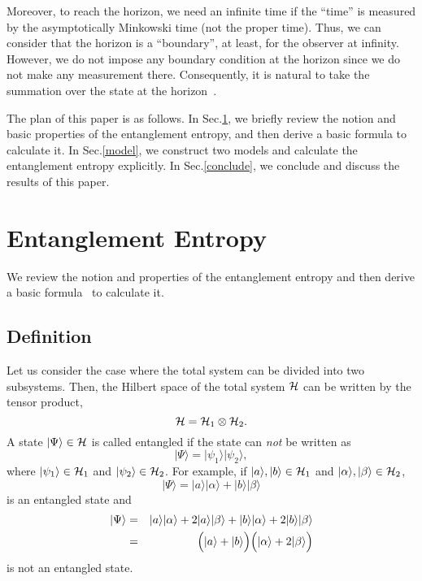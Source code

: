Moreover, to reach the horizon, we need an infinite time 
if the ``time'' is measured by
the asymptotically Minkowski time (not the proper time).
Thus, we can consider that the horizon is a ``boundary'',
at least, for the observer at infinity.
However, we do not impose any boundary condition at the horizon
since we do not make any measurement there.
Consequently, it is natural to take the summation
over the state at the horizon~\cite{Hawkin76}.

The plan of this paper is as follows.
In Sec.\ref{formula}, we briefly review
the notion and basic properties of the entanglement entropy,
and then derive a basic formula to calculate it.
In Sec.\ref{model}, we construct two models and
calculate the entanglement entropy explicitly.
In Sec.\ref{conclude}, we conclude and discuss
the results of this paper.

\section{Entanglement Entropy}
\label{formula}
We review the notion and properties
of the entanglement entropy
and then derive a basic
formula~\cite{BKLS86} to calculate it.

\subsection{Definition}
Let us consider the case where the total system 
can be divided into two subsystems.
Then, the Hilbert space of the total system ${\cal H}$
can be written by the tensor product,
\begin{equation}
{\cal H}={\cal H}_1\otimes{\cal H}_2.
\end{equation}
A state $|\Psi\rangle\in{\cal H}$ is called entangled
if the state can {\em not} be written as
\begin{equation}
 |\Psi\rangle=|\psi_1\rangle|\psi_2\rangle,
\end{equation}
where $|\psi_1\rangle\in{\cal H}_1$ and
$|\psi_2\rangle\in{\cal H}_2$.
For example,
if $|a\rangle,|b\rangle\in{\cal H}_1$ and
$|\alpha\rangle,|\beta\rangle\in{\cal H}_2$,
\begin{equation}
 |\Psi\rangle=|a\rangle|\alpha\rangle
    +|b\rangle|\beta\rangle
\end{equation}
is an entangled state and
\begin{eqnarray}
 |\Psi\rangle &=& |a\rangle|\alpha\rangle
    +2|a\rangle|\beta\rangle+|b\rangle|\alpha\rangle
   +2|b\rangle|\beta\rangle \nonumber \\
    &=& \Bigl(|a\rangle+|b\rangle\Bigr)
       \Bigl(|\alpha\rangle+2|\beta\rangle\Bigr)
\end{eqnarray}
is not an entangled state.

